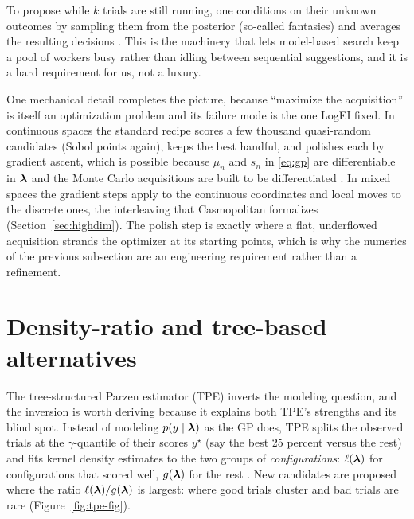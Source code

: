 To propose while $k$
trials are still running, one conditions on their unknown outcomes by
sampling them from the posterior (so-called fantasies) and averages the
resulting decisions \citep{balandat2020botorch}. This is the machinery
that lets model-based search keep a pool of workers busy rather than
idling between sequential suggestions, and it is a hard requirement for
us, not a luxury.

One mechanical detail completes the picture, because ``maximize the
acquisition'' is itself an optimization problem and its failure mode is
the one LogEI fixed. In continuous spaces the standard recipe scores a
few thousand quasi-random candidates (Sobol points again), keeps the
best handful, and polishes each by gradient ascent, which is possible
because $\mu_n$ and $s_n$ in \eqref{eq:gp} are differentiable in
$\bm{\lambda}$ and the Monte Carlo acquisitions are built to be
differentiated \citep{balandat2020botorch}. In mixed spaces the
gradient steps apply to the continuous coordinates and local moves to
the discrete ones, the interleaving that Casmopolitan formalizes
(Section~\ref{sec:highdim}). The polish step is exactly where a flat,
underflowed acquisition strands the optimizer at its starting points,
which is why the numerics of the previous subsection are an
engineering requirement rather than a refinement.

\section{Density-ratio and tree-based alternatives}
\label{sec:tpe}

The tree-structured Parzen estimator (TPE) inverts the modeling question,
and the inversion is worth deriving because it explains both TPE's
strengths and its blind spot. Instead of modeling $p(y \mid \bm{\lambda})$ as
the GP does, TPE splits the observed trials at the $\gamma$-quantile of
their scores $y^{\star}$ (say the best 25 percent versus the rest) and
fits kernel density estimates to the two groups of \emph{configurations}:
$\ell(\bm{\lambda})$ for configurations that scored well, $g(\bm{\lambda})$ for the
rest \citep{bergstra2011tpe}. New candidates are proposed where the ratio
$\ell(\bm{\lambda})/g(\bm{\lambda})$ is largest: where good trials cluster and bad
trials are rare (Figure~\ref{fig:tpe-fig}).

